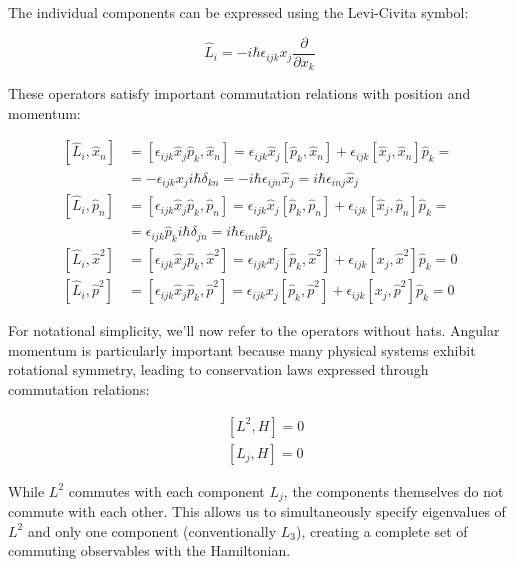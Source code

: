 \documentclass[italian]{HKNdocument}
\begin{document}
The individual components can be expressed using the Levi-Civita symbol:

\begin{equation}
\hat{L}_{i}=-i \hbar \epsilon_{i j k} x_{j} \frac{\partial}{\partial x_{k}}
\end{equation}

These operators satisfy important commutation relations with position and momentum:

\begin{align}
{\left[\hat{L}_{i}, \hat{x}_{n}\right] } & =\left[\epsilon_{i j k} \hat{x}_{j} \hat{p}_{k}, \hat{x}_{n}\right]=\epsilon_{i j k} \hat{x}_{j}\left[\hat{p}_{k}, \hat{x}_{n}\right]+\epsilon_{i j k}\left[\hat{x}_{j}, \hat{x}_{n}\right] \hat{p}_{k}= \\
& =-\epsilon_{i j k} x_{j} i \hbar \delta_{k n}=-i \hbar \epsilon_{i j n} \hat{x}_{j}=i \hbar \epsilon_{i n j} \hat{x}_{j}  \\
{\left[\hat{L}_{i}, \hat{p}_{n}\right] } & =\left[\epsilon_{i j k} \hat{x}_{j} \hat{p}_{k}, \hat{p}_{n}\right]=\epsilon_{i j k} \hat{x}_{j}\left[\hat{p}_{k}, \hat{p}_{n}\right]+\epsilon_{i j k}\left[\hat{x}_{j}, \hat{p}_{n}\right] \hat{p}_{k}= \\
& =\epsilon_{i j k} \hat{p}_{k} i \hbar \delta_{j n}=i \hbar \epsilon_{i n k} \hat{p}_{k}  \\
{\left[\hat{L}_{i}, \hat{x}^{2}\right] } & =\left[\epsilon_{i j k} \hat{x}_{j} \hat{p}_{k}, \hat{x}^{2}\right]=\epsilon_{i j k} x_{j}\left[\hat{p}_{k}, \hat{x}^{2}\right]+\epsilon_{i j k}\left[x_{j}, \hat{x}^{2}\right] \hat{p}_{k}=0  \\
{\left[\hat{L}_{i}, \hat{p}^{2}\right] } & =\left[\epsilon_{i j k} \hat{x}_{j} \hat{p}_{k}, \hat{p}^{2}\right]=\epsilon_{i j k} x_{j}\left[\hat{p}_{k}, \hat{p}^{2}\right]+\epsilon_{i j k}\left[x_{j}, \hat{p}^{2}\right] \hat{p}_{k}=0
\end{align}

For notational simplicity, we'll now refer to the operators without hats. Angular momentum is particularly important because many physical systems exhibit rotational symmetry, leading to conservation laws expressed through commutation relations:

\begin{align}
& {\left[L^{2}, H\right]=0} \\
& {\left[L_{j}, H\right]=0}
\end{align}

While $L^2$ commutes with each component $L_j$, the components themselves do not commute with each other. This allows us to simultaneously specify eigenvalues of $L^2$ and only one component (conventionally $L_3$), creating a complete set of commuting observables with the Hamiltonian.
\end{document}
